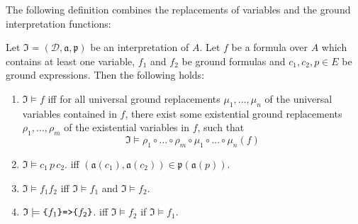 



The following definition combines the replacements of variables and the ground interpretation functions:






\begin{definition}
Let $\mathfrak{I}=(\mathcal{D},\mathfrak{a,p})$ be an interpretation of $A$.
Let  $f$ be a formula over $A$ which contains at least one variable, $f_1$ and $f_2$ be ground formulas and $c_1,c_2,p \in E$ be ground expressions.
Then the following holds:
\begin{enumerate}
 \item\label{quant} $\mathfrak{I}\models f$ iff for all universal ground replacements $\mu_1,\ldots,\mu_n$ of the universal variables contained in $f$,  there exist some existential ground replacements
 $\rho_1,\ldots,\rho_m$ of the existential variables in $f$, such that 
 \[\mathfrak{I}\models \rho_1\circ\ldots\circ \rho_m \circ \mu_1\circ\ldots\circ\mu_n(f)\]

 \item $\mathfrak{I} \models c_1\, p\, c_2$. iff $(\mathfrak{a}(c_1),\mathfrak{a}(c_2))\in\mathfrak{p}(\mathfrak{a}(p))$.
 \item \label{conj} $\mathfrak{I} \models f_1 f_2$ iff $\mathfrak{I}\models f_1$ and $\mathfrak{I} \models f_2$.
 \item \label{impl1} $\mathfrak{I} \models \verb!{! f_1 \verb!}! \verb!=>! \verb!{! f_2 \verb!}!$. iff $\mathfrak{I} \models f_2$ if $\mathfrak{I} \models f_1$. 
 
\end{enumerate} 
\end{definition}

